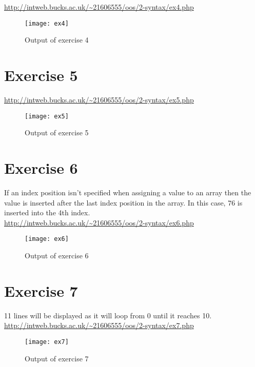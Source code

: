 \url{http://intweb.bucks.ac.uk/~21606555/oos/2-syntax/ex4.php}
\captionsetup{type=figure}


\begin{figure}[H]
  \caption{Output of exercise 4}
  \centering
  \texttt{[image: ex4]}
\end{figure}

\clearpage
\section{Exercise 5}

\url{http://intweb.bucks.ac.uk/~21606555/oos/2-syntax/ex5.php}
\captionsetup{type=figure}


\begin{figure}[H]
  \caption{Output of exercise 5}
  \centering
  \texttt{[image: ex5]}
\end{figure}

\section{Exercise 6}

If an index position isn't specified when assigning a value to an array then the value is inserted after the last index position in the array. In this case, $76$ is inserted into the 4th index.\\

\url{http://intweb.bucks.ac.uk/~21606555/oos/2-syntax/ex6.php}
\captionsetup{type=figure}


\begin{figure}[H]
  \caption{Output of exercise 6}
  \centering
  \texttt{[image: ex6]}
\end{figure}

\section{Exercise 7}

11 lines will be displayed as it will loop from 0 until it reaches 10.\\

\url{http://intweb.bucks.ac.uk/~21606555/oos/2-syntax/ex7.php}
\captionsetup{type=figure}


\begin{figure}[H]
  \caption{Output of exercise 7}
  \centering
  \texttt{[image: ex7]}
\end{figure}

